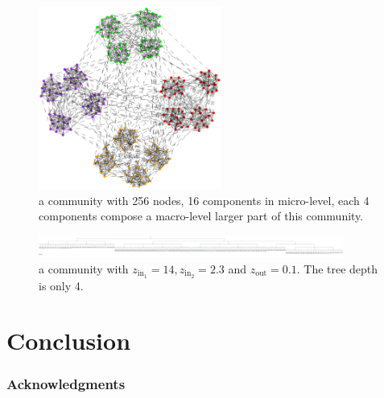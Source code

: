 \documentclass{article}
\begin{document}
\begin{figure}
\centering
\includegraphics[width=6cm]{pic/two_level.eps}
\caption{a community with 256 nodes, 16 components in micro-level, each 4 components compose a macro-level larger part of this community.}\label{fig:c1}
\end{figure}

\begin{figure}
\centering
\includegraphics[width=10cm]{pic/tree.pdf}
\caption{a community with $z_{\mathrm{in}_1} = 14, z_{\mathrm{in}_2} = 2.3$ and $z_{\mathrm{out}}=0.1$. The tree depth is only 4.}\label{fig:c2}
\end{figure}

\section{Conclusion}\label{sec:conclusion}


\subsubsection*{Acknowledgments}





\end{document}
